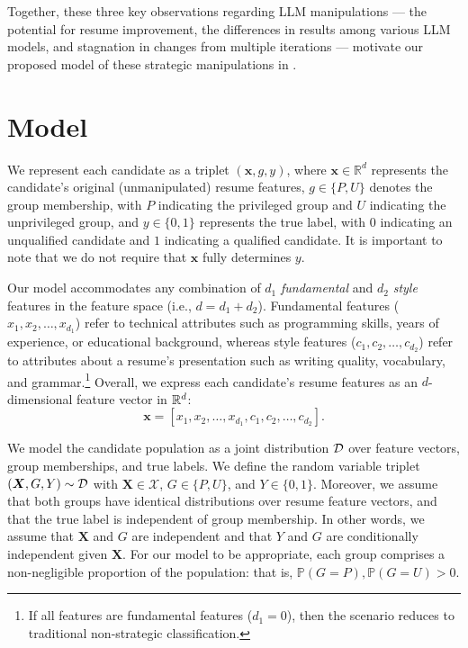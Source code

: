 Together, these three key observations regarding LLM manipulations --- the potential for resume improvement, the differences in results among various LLM models, and stagnation in changes from multiple iterations  --- motivate our proposed model of these strategic manipulations in . 
\section{%
Model} \label{sec: model}


We represent each candidate as a triplet \((\bm{x}, g, y)\), where \(\bm{x} \in \mathbb{R}^{d}\) represents the candidate's original (unmanipulated) resume features, \(g \in \{P, U\}\) denotes the group membership, with $P$ indicating the privileged group and $U$ indicating the unprivileged group, and \(y \in \{0,1\}\) represents the true label, with $0$ indicating an unqualified candidate and $1$ indicating a qualified candidate. It is important to note that we do not require that \(\bm{x}\) fully determines \(y\).



Our model accommodates any combination of $d_1$ \textit{fundamental} and $d_2$ \textit{style} features in the feature space (i.e., $d=d_1+d_2$). Fundamental features ($x_1, x_2, \dots, x_{d_1}$) refer to technical attributes such as programming skills, years of experience, or educational background, whereas style features ($c_1, c_2, \dots, c_{d_2}$) refer to attributes about a resume's presentation such as writing quality, vocabulary, and grammar.\footnote{If all features are fundamental features (\(d_1 = 0\)), then the scenario reduces to traditional non-strategic classification.} Overall, we express each candidate's resume features as an \(d\)-dimensional feature vector in \(\mathbb{R}^{d}\):
\[\bm{x} = [x_1, x_2, \dots, x_{d_1}, c_1, c_2, \dots, c_{d_2}]. \]


We model the candidate population as a joint distribution \(\mathcal{D}\) over feature vectors, group memberships, and true labels. We define the random variable triplet \((\bm{X}, G, Y) \sim \mathcal{D}\) with \(\bm{X} \in \mathcal{X}\), \(G \in \{P, U\}\), and \(Y \in \{0,1\}\). Moreover, we assume that both groups have identical distributions over resume feature vectors, and that the true label is independent of group membership. In other words, we assume that \(\bm{X}\) and \(G\) are independent and that \(Y\) and \(G\) are conditionally independent given \(\bm{X}\). For our model to be appropriate, each group comprises a non-negligible proportion of the population: that is, \(\mathbb{P}(G = P), \mathbb{P}(G = U) > 0\).

